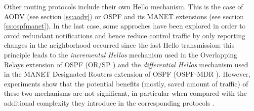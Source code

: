 Other routing protocols include their own Hello mechanism. This is the case of AODV \cite{AODV-RFC3561} (see section \ref{ss:aodv}) or OSPF and its MANET extensions \cite{rfc5449,rfc5614,rfc5820} (see section \ref{ss:ospfmanet}). In the last case, some approches have been explored in order to avoid redundant notifications and hence reduce control traffic by only reporting changes in the neighborhood occurred since the last Hello transmission: this principle leads to the {\em incremental Hellos} mechanism used in the Overlapping Relays extension of OSPF (OR/SP \cite{rfc5820}) and the {\em differential Hellos} mechanism used in the MANET Designated Routers extension of OSPF (OSPF-MDR \cite{rfc5614}). However, experiments show that the potential benefits (mostly, saved amount of traffic) of these two mechanisms are not significant, in particular when compared with the additional complexity they introduce in the corresponding protocols \cite{aircc}.




